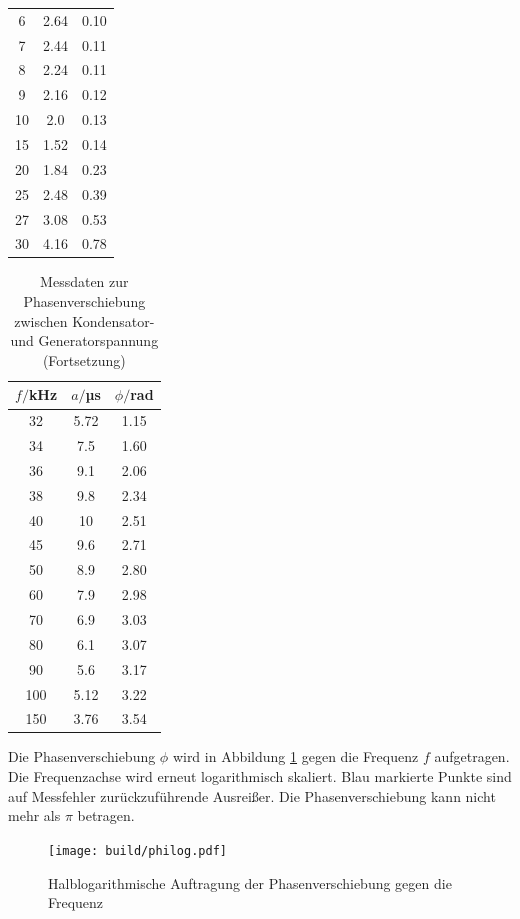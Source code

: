\begin{table}
\begin{tabular}{c c c}
 6	   &    2.64 & 0.10 \\
 7	   &    2.44 & 0.11 \\
 8	   &    2.24 & 0.11 \\
 9	   &    2.16 & 0.12 \\
10	   &    2.0  & 0.13 \\
15	   &    1.52 & 0.14 \\
20	   &    1.84 & 0.23 \\
25	   &    2.48 & 0.39 \\
27	   &    3.08 & 0.53 \\
30	   &    4.16 & 0.78 \\
\bottomrule
\end{tabular}
\end{table}

\begin{table}
\centering
\caption{Messdaten zur Phasenverschiebung zwischen Kondensator- und Generatorspannung (Fortsetzung)}
\label{tab:phase2}
\begin{tabular}{c c c}
\toprule
$f/$kHz & $a/$µs & $\phi/$rad \\
\midrule
32	& 5.72 & 1.15 \\
34	& 7.5  & 1.60 \\
36	& 9.1  & 2.06 \\
38	& 9.8  & 2.34 \\
40	& 10   & 2.51 \\
45	& 9.6  & 2.71 \\
50	& 8.9  & 2.80 \\
60	& 7.9  & 2.98 \\
70	& 6.9  & 3.03 \\
80	& 6.1  & 3.07 \\
90	& 5.6  & 3.17 \\
100 & 5.12 & 3.22 \\
150 & 3.76 & 3.54 \\
\bottomrule
\end{tabular}
\end{table}

Die Phasenverschiebung $\phi$ wird in Abbildung \ref{fig:philog} gegen die Frequenz
$f$ aufgetragen. Die Frequenzachse wird erneut logarithmisch skaliert. Blau markierte
Punkte sind auf Messfehler zurückzuführende Ausreißer. Die Phasenverschiebung kann
nicht mehr als $\pi$ betragen.

\begin{figure}
  \centering
  \texttt{[image: build/philog.pdf]}
  \caption{Halblogarithmische Auftragung der Phasenverschiebung gegen die Frequenz}
  \label{fig:philog}
\end{figure}

